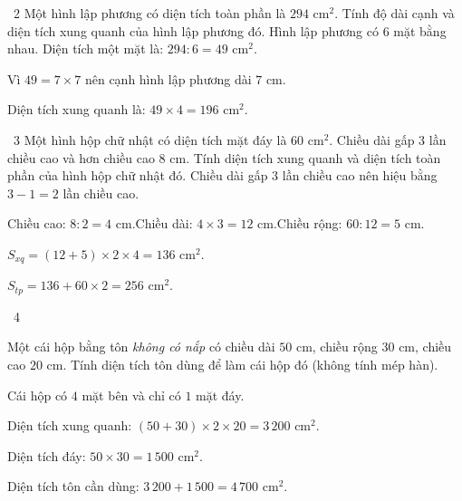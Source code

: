 \gap
\begin{exbox}{\ExWord\ 2}
Một hình lập phương có diện tích toàn phần là $294$ cm$^2$. Tính độ dài cạnh và diện tích xung quanh của hình lập phương đó.
\guide
Hình lập phương có $6$ mặt bằng nhau. Diện tích một mặt là: $294:6=49$ cm$^2$.\par
Vì $49=7\times7$ nên cạnh hình lập phương dài $7$ cm.\par
Diện tích xung quanh là: $49\times4=196$ cm$^2$.
\end{exbox}
\gap
\begin{exbox}{\ExWord\ 3}
Một hình hộp chữ nhật có diện tích mặt đáy là $60$ cm$^2$. Chiều dài gấp $3$ lần chiều cao và hơn chiều cao $8$ cm. Tính diện tích xung quanh và diện tích toàn phần của hình hộp chữ nhật đó.
\guide
Chiều dài gấp $3$ lần chiều cao nên hiệu bằng $3-1=2$ lần chiều cao.\par
Chiều cao: $8:2=4$ cm.\quad Chiều dài: $4\times3=12$ cm.\quad Chiều rộng: $60:12=5$ cm.\par
$S_{xq}=(12+5)\times2\times4=136$ cm$^2$.\par
$S_{tp}=136+60\times2=256$ cm$^2$.
\end{exbox}
\gap
\begin{exbox}{\ExWord\ 4}
\begin{minipage}[t]{0.6\linewidth}
Một cái hộp bằng tôn \emph{không có nắp} có chiều dài $50$ cm, chiều rộng $30$ cm, chiều cao $20$ cm. Tính diện tích tôn dùng để làm cái hộp đó (không tính mép hàn).
\end{minipage}\hfill
\begin{minipage}[t]{0.36\linewidth}\vspace{0pt}\centering
{}
\end{minipage}
\guide
Cái hộp có $4$ mặt bên và chỉ có $1$ mặt đáy.\par
Diện tích xung quanh: $(50+30)\times2\times20=3\,200$ cm$^2$.\par
Diện tích đáy: $50\times30=1\,500$ cm$^2$.\par
Diện tích tôn cần dùng: $3\,200+1\,500=4\,700$ cm$^2$.
\end{exbox}
